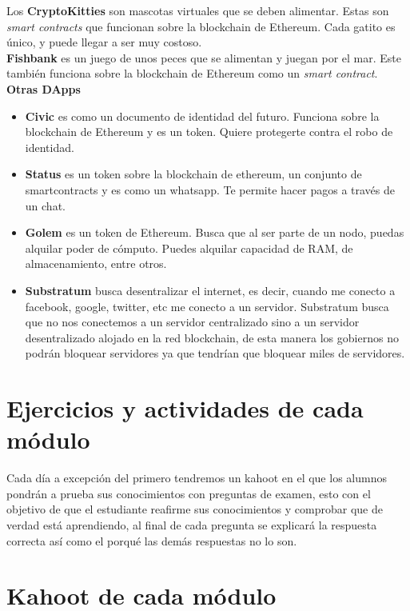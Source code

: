 \documentclass[a4paper,12pt]{/home/armando/Documentos/Cursos/LaTeX/Plantillas/lib/pub}
\begin{document}
Los \textbf{CryptoKitties} son mascotas virtuales que se deben alimentar. Estas son \textit{smart contracts} que funcionan sobre la blockchain de Ethereum. Cada gatito es único, y puede llegar a ser muy costoso.\\

\textbf{Fishbank} es un juego de unos peces que se alimentan y juegan por el mar. Este también funciona sobre la blockchain de Ethereum como un \textit{smart contract}.\\

\textbf{Otras DApps}
	\begin{itemize}
	\item \textbf{Civic} es como un documento de identidad del futuro. Funciona sobre la blockchain de Ethereum y es un token. Quiere protegerte contra el robo de identidad.
	\item \textbf{Status} es un token sobre la blockchain de ethereum, un conjunto de smartcontracts y es como un whatsapp. Te permite hacer pagos a través de un chat.
	\item \textbf{Golem} es un token de Ethereum. Busca que al ser parte de un nodo, puedas alquilar poder de cómputo. Puedes alquilar capacidad de RAM, de almacenamiento, entre otros.
	\item \textbf{Substratum} busca desentralizar el internet, es decir, cuando me conecto a facebook, google, twitter, etc me conecto a un servidor. Substratum busca que no nos conectemos a un servidor centralizado sino a un servidor desentralizado alojado en la red blockchain, de esta manera los gobiernos no podrán bloquear servidores ya que tendrían que bloquear miles de servidores.
\end{itemize}

\section{Ejercicios y actividades de cada módulo}
Cada día a excepción del primero tendremos un kahoot en el que los alumnos pondrán a prueba sus conocimientos con preguntas de examen, esto con el objetivo de que el estudiante reafirme sus conocimientos y comprobar que de verdad está aprendiendo, al final de cada pregunta se explicará la respuesta correcta así como el porqué las demás respuestas no lo son.

\section{Kahoot de cada módulo}
\end{document}

